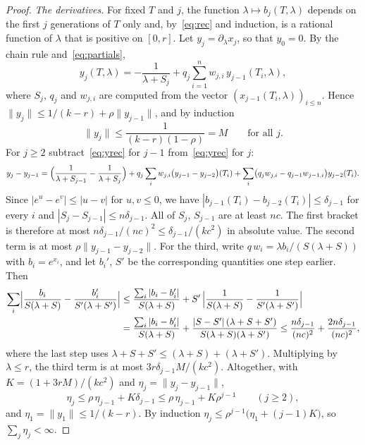 \documentclass[11pt]{amsart}
\theoremstyle{definition}
\begin{document}
\begin{proof}
\emph{The derivatives.} For fixed $T$ and $j$, the function $\lambda\mapsto b_j(T,\lambda)$ depends on the first
$j$ generations of $T$ only and, by~\eqref{eq:rec} and induction, is a rational function of $\lambda$ that is
positive on $[0,r]$. Let $y_j=\partial_\lambda x_j$, so that $y_0=0$. By the chain rule and~\eqref{eq:partials},
\begin{equation}\label{eq:yrec}
   y_j(T,\lambda)=-\frac1{\lambda+S_j}+q_j\sum_{i=1}^nw_{j,i}\,y_{j-1}(T_i,\lambda),
\end{equation}
where $S_j$, $q_j$ and $w_{j,i}$ are computed from the vector $(x_{j-1}(T_i,\lambda))_{i\le n}$. Hence
$\|y_j\|\le1/(k-r)+\rho\|y_{j-1}\|$, and by induction
\[
   \|y_j\|\le\frac1{(k-r)(1-\rho)}=M\qquad\text{for all }j.
\]
For $j\ge2$ subtract~\eqref{eq:yrec} for $j-1$ from~\eqref{eq:yrec} for $j$:
\[
   y_j-y_{j-1}=\Bigl(\frac1{\lambda+S_{j-1}}-\frac1{\lambda+S_j}\Bigr)
     +q_j\sum_iw_{j,i}\bigl(y_{j-1}-y_{j-2}\bigr)(T_i)
     +\sum_i\bigl(q_jw_{j,i}-q_{j-1}w_{j-1,i}\bigr)y_{j-2}(T_i).
\]
Since $|e^u-e^v|\le|u-v|$ for $u,v\le0$, we have $|b_{j-1}(T_i)-b_{j-2}(T_i)|\le\delta_{j-1}$ for every $i$ and
$|S_j-S_{j-1}|\le n\delta_{j-1}$. All of $S_j$, $S_{j-1}$ are at least $nc$. The first bracket is therefore at
most $n\delta_{j-1}/(nc)^2\le\delta_{j-1}/(kc^2)$ in absolute value. The second term is at most
$\rho\|y_{j-1}-y_{j-2}\|$. For the third, write $q\,w_i=\lambda b_i/(S(\lambda+S))$ with $b_i=e^{x_i}$, and let
$b_i'$, $S'$ be the corresponding quantities one step earlier. Then
\begin{align*}
  \sum_i\Bigl|\frac{b_i}{S(\lambda+S)}-\frac{b_i'}{S'(\lambda+S')}\Bigr|
  &\le\frac{\sum_i|b_i-b_i'|}{S(\lambda+S)}+S'\,\Bigl|\frac1{S(\lambda+S)}-\frac1{S'(\lambda+S')}\Bigr|\\
  &=\frac{\sum_i|b_i-b_i'|}{S(\lambda+S)}+\frac{|S-S'|\,(\lambda+S+S')}{S(\lambda+S)(\lambda+S')}
  \le\frac{n\delta_{j-1}}{(nc)^2}+\frac{2n\delta_{j-1}}{(nc)^2},
\end{align*}
where the last step uses $\lambda+S+S'\le(\lambda+S)+(\lambda+S')$. Multiplying by $\lambda\le r$, the third
term is at most $3r\delta_{j-1}M/(kc^2)$. Altogether, with $K=(1+3rM)/(kc^2)$ and
$\eta_j=\|y_j-y_{j-1}\|$,
\[
   \eta_j\le\rho\,\eta_{j-1}+K\delta_{j-1}\le\rho\,\eta_{j-1}+K\rho^{j-1}\qquad(j\ge2),
\]
and $\eta_1=\|y_1\|\le1/(k-r)$. By induction $\eta_j\le\rho^{j-1}\bigl(\eta_1+(j-1)K\bigr)$, so
$\sum_j\eta_j<\infty$.


\end{proof}
\end{document}
